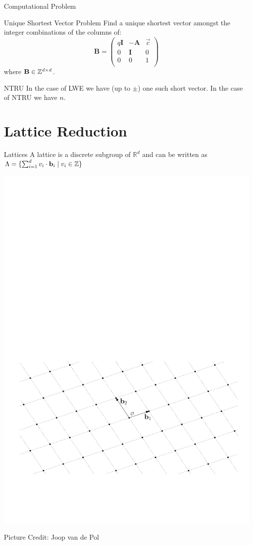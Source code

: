 \documentclass[xcolor=table,10pt,aspectratio=169]{beamer}
\begin{document}
\begin{frame}[label={sec:orge896f7c}]{Computational Problem}
\begin{block}{Unique Shortest Vector Problem}
Find a unique shortest vector amongst the integer combinations of the columns of:
\[
  \mathbf{B} = \begin{pmatrix}
    q\mathbf{I} & -\mathbf{A} & \vec{c}\\
    0 & \mathbf{I} & 0\\
    0 & 0 & 1\\
  \end{pmatrix}
\]
where \(\mathbf{B} \in \mathbb{Z}^{d \times d}\).

\pause
\end{block}

\begin{alertblock}{NTRU}
In the case of LWE we have (up to \(\pm\)) one such short vector. In the case of NTRU we have \(n\).
\end{alertblock}
\end{frame}

\section{Lattice Reduction}
\label{sec:org39254a9}
\begin{frame}[label={sec:org52bcfb9}]{Lattices}
A lattice is a discrete subgroup of \(\mathbb{R}^d\) and can be written as \(\Lambda = \{\sum_{i=1}^{d} v_i \cdot \mathbf{b}_i \mid v_i \in \mathbb{Z}\}\)

\begin{center}
\includegraphics[width=0.8\linewidth]{./joop-latt1.pdf}
\end{center}

\tiny Picture Credit: Joop van de Pol
\end{frame}
\end{document}
